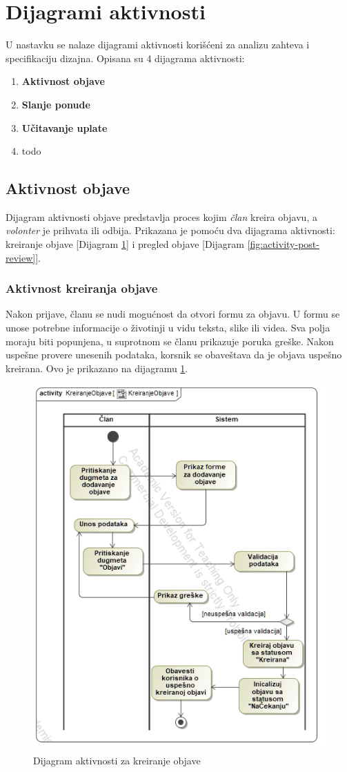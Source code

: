 \section{Dijagrami aktivnosti}
\par U nastavku se nalaze dijagrami aktivnosti korišćeni za analizu zahteva i specifikaciju dizajna.
Opisana su 4 dijagrama aktivnosti:
\begin{enumerate}
    \item \textbf{Aktivnost objave}
    \item \textbf{Slanje ponude}
    \item \textbf{Učitavanje uplate}
    \item todo
\end{enumerate}
\subsection{Aktivnost objave}
\par Dijagram aktivnosti objave predstavlja proces kojim \textit{član} kreira objavu, a \textit{volonter} je prihvata ili odbija.
Prikazana je pomoću dva dijagrama aktivnosti: kreiranje objave [Dijagram \ref{fig:activity-create-post}] i pregled objave [Dijagram \ref{fig:activity-post-review}].
\subsubsection*{Aktivnost kreiranja objave}
\par Nakon prijave, članu se nudi mogućnost da otvori formu za objavu. U formu se unose potrebne informacije o životinji u vidu teksta, slike ili videa.
Sva polja moraju biti popunjena, u suprotnom se članu prikazuje poruka greške. Nakon uspešne provere unesenih podataka, korsnik se obaveštava da je 
objava uspešno kreirana. Ovo je prikazano na dijagramu \ref{fig:activity-create-post}.
\begin{figure}[h]
    \centering
    \includegraphics[width=\textwidth, height=0.75\textwidth]{img/activity-create-post.jpg}
    \caption{Dijagram aktivnosti za kreiranje objave}
    \label{fig:activity-create-post}
\end{figure}
